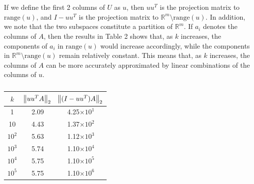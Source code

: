 \documentclass[11pt]{article}
\begin{document}
\section{}
If we define the first 2 columns of $U$ as $u$, then $uu^T$ is the projection matrix to $\text{range}(u)$, and $I-uu^T$ is the projection matrix to $\mathbb{R}^m\text{\textbackslash range}(u)$. In addition, we note that the two subspaces constitute a partition of $\mathbb{R}^m$. If $a_i$ denotes the columns of $A$, then the results in Table 2 shows that, as $k$ increases, the components of $a_i$ in $\text{range}(u)$ would increase accordingly, while the components in $\mathbb{R}^m\text{\textbackslash range}(u)$ remain relatively constant. This means that, as $k$ increases, the columns of $A$ can be more accurately approximated by linear combinations of the columns of $u$. 
\begin{center}
\begin{table}
\caption{}
\centering
\begin{tabular}[t]{ | c | c c |}
\hline
$k$ & $\norm{uu^TA}_2$ & $\norm{(I-uu^T)A}_2$ \\[0.25cm]
\hline
 1 & 2.09 & 4.25$\times10^1$\\ 
 10 & 4.43 & 1.37$\times10^2$\\
 $10^2$ & 5.63 & 1.12$\times10^3$\\ 
 $10^3$ & 5.74 & 1.10$\times10^4$\\ 
 $10^4$ & 5.75 & 1.10$\times10^5$\\ 
 $10^5$ & 5.75 & 1.10$\times10^6$\\
 \hline
\end{tabular}
\end{table}
\end{center}
\end{document}
